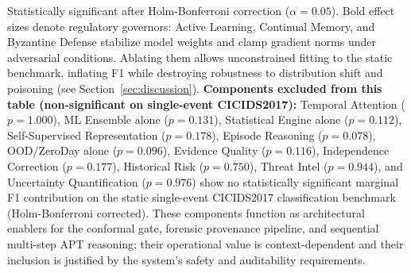 \begin{table}[t]
{\begin{tabular}{@{}llccrrrl@{}}
\end{tabular}
}
\vspace{1ex}
{\raggedright \footnotesize * Statistically significant after Holm-Bonferroni correction ($\alpha=0.05$). Bold effect sizes denote regulatory governors: Active Learning, Continual Memory, and Byzantine Defense stabilize model weights and clamp gradient norms under adversarial conditions. Ablating them allows unconstrained fitting to the static benchmark, inflating F1 while destroying robustness to distribution shift and poisoning (see Section~\ref{sec:discussion}). \textbf{Components excluded from this table (non-significant on single-event CICIDS2017):} Temporal Attention ($p=1.000$), ML Ensemble alone ($p=0.131$), Statistical Engine alone ($p=0.112$), Self-Supervised Representation ($p=0.178$), Episode Reasoning ($p=0.078$), OOD/ZeroDay alone ($p=0.096$), Evidence Quality ($p=0.116$), Independence Correction ($p=0.177$), Historical Risk ($p=0.750$), Threat Intel ($p=0.944$), and Uncertainty Quantification ($p=0.976$) show no statistically significant marginal F1 contribution on the static single-event CICIDS2017 classification benchmark (Holm-Bonferroni corrected). These components function as architectural enablers for the conformal gate, forensic provenance pipeline, and sequential multi-step APT reasoning; their operational value is context-dependent and their inclusion is justified by the system's safety and auditability requirements.\par}
\end{table}

